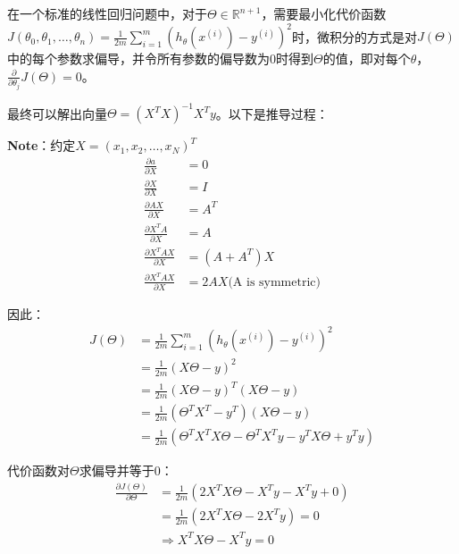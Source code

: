 \documentclass[12pt, a4paper]{article}
\begin{document}
在一个标准的线性回归问题中，对于$\Theta\in\mathbb{R}^{n+1}$，需要最小化代价函数$J(\theta_0,\theta_1,\dots,\theta_n)=\frac{1}{2m}\sum_{i=1}^{m}(h_\theta(x^{(i)})-y^{(i)})^2$时，微积分的方式是对$J(\Theta)$中的每个参数求偏导，并令所有参数的偏导数为0时得到$\Theta$的值，即对每个$\theta$，$\frac{\partial}{\partial\theta_j}J(\Theta)=0$。

最终可以解出向量$\Theta=(X^TX)^{-1}X^Ty$。以下是推导过程：

\textbf{Note}：约定$X=(x_1, x_2,\dots,x_N)^T$
\begin{align*}
    \frac{\partial a}{\partial X}     & = 0                           \\
    \frac{\partial X}{\partial X}     & = I                           \\
    \frac{\partial AX}{\partial X}    & = A^T                         \\
    \frac{\partial X^TA}{\partial X}  & = A                           \\
    \frac{\partial X^TAX}{\partial X} & = (A+A^T)X                    \\
    \frac{\partial X^TAX}{\partial X} & = 2AX \text{(A is symmetric)}
\end{align*}

因此：
\begin{align*}
    J(\Theta) & = \frac{1}{2m}\sum_{i=1}^{m}(h_\theta(x^{(i)})-y^{(i)})^2       \\
              & = \frac{1}{2m}(X\Theta-y)^2                                     \\
              & = \frac{1}{2m}(X\Theta-y)^T(X\Theta-y)                          \\
              & = \frac{1}{2m}(\Theta^TX^T-y^T)(X\Theta-y)                      \\
              & = \frac{1}{2m}(\Theta^TX^TX\Theta-\Theta^TX^Ty-y^TX\Theta+y^Ty)
\end{align*}

代价函数对$\Theta$求偏导并等于0：
\begin{align*}
    \frac{\partial J(\Theta)}{\partial\Theta} & = \frac{1}{2m}(2X^TX\Theta-X^Ty-X^Ty+0) \\
                                              & = \frac{1}{2m}(2X^TX\Theta-2X^Ty) = 0   \\
                                              & \Rightarrow X^TX\Theta-X^Ty=0           \\
\end{align*}
\end{document}
